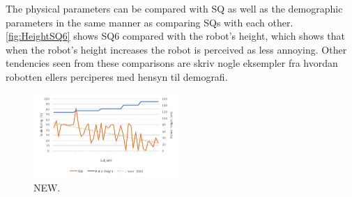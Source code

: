 The physical parameters can be compared with SQ as well as the demographic parameters in the same manner as comparing SQs with each other. \autoref{fig:HeightSQ6} shows SQ6 compared with the robot's height, which shows that when the robot's height increases the robot is perceived as less annoying. Other tendencies seen from these comparisons are {\color{red} skriv nogle eksempler fra hvordan robotten ellers perciperes med hensyn til demografi.}
%
\begin{figure}[H]
	\centering
	\includegraphics[width = 0.49\textwidth]{Figure/HeightSQ6}
	\setlength{} 
	\caption{NEW.}
	\label{fig:HeightSQ6}
\end{figure}
\noindent
%